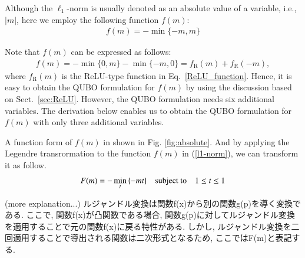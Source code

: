 \documentclass[fp,twocolumn]{jpsj3}
\begin{document}
Although the $\ell_{1}$-norm is usually denoted as an absolute value of a variable, i.e., $\lvert m \rvert$, here we employ the following function $f(m)$:\\
\begin{eqnarray}
  f(m)=-\min{\{-m,m\}} \label{l1-norm}
\end{eqnarray}



Note that $f(m)$ can be expressed as follows:
\begin{eqnarray}
f(m)=-\min{\{0,m\}} - \min\{-m,0 \} = f_{\mathrm{R}}(m) + f_{\mathrm{R}}(-m),
\end{eqnarray}
where $f_{\mathrm{R}}(m)$ is the ReLU-type function in Eq.~\eqref{ReLU_function}.
Hence, it is easy to obtain the QUBO formulation for $f(m)$ by using the discussion based on Sect.~\ref{sec:ReLU}.
However, the QUBO formulation needs six additional variables.
The derivation below enables us to obtain the QUBO formulation for $f(m)$ with only three additional variables.



A function form of $f(m)$ in shown in Fig. \ref{fig:absolute}. And by applying the Legendre transrormation to the function $f(m)$ in (\ref{l1-norm}), we can transform it as follow. 
\begin{eqnarray}
  F(m)=-\min_{t}{\{-mt\}} \quad \text{subject to} \quad \-1 \leq t \leq 1 \label{legendre}
\end{eqnarray}


{\color{red}
  (more explanation...)
  ルジャンドル変換は関数f(x)から別の関数g(p)を導く変換である. ここで, 関数f(x)が凸関数である場合, 関数g(p)に対してルジャンドル変換を適用することで元の関数f(x)に戻る特性がある. しかし, ルジャンドル変換を二回適用することで導出される関数は二次形式となるため, ここではF(m)と表記する.
}
\end{document}
